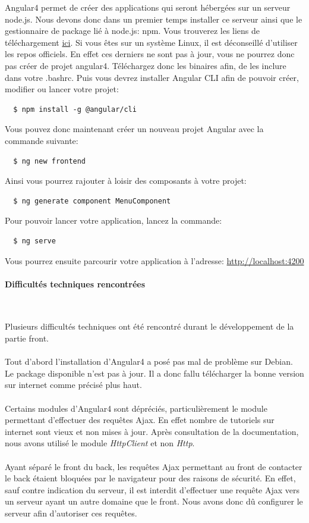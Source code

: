 \documentclass{article}
\begin{document}
  Angular4 permet de créer des applications qui seront hébergées sur un serveur node.js.
  Nous devons donc dans un premier temps installer ce serveur ainsi que le gestionnaire
  de package lié à node.js: npm. Vous trouverez les liens de téléchargement 
  \href{https://nodejs.org/en/download/}{ici}. Si vous êtes sur un système Linux,
  il est déconseillé d'utiliser les repos officiels. En effet ces derniers ne sont pas à jour,
  vous ne pourrez donc pas créer de projet angular4. Téléchargez donc les binaires afin,
  de les inclure dans votre .bashrc. Puis vous devrez installer
  Angular CLI afin de pouvoir créer, modifier ou lancer votre projet:
  \begin{lstlisting}
  $ npm install -g @angular/cli
  \end{lstlisting}
  Vous pouvez donc maintenant créer un nouveau projet Angular avec la commande suivante:
  \begin{lstlisting}
  $ ng new frontend
  \end{lstlisting}
  Ainsi vous pourrez rajouter à loisir des composants à votre projet:
  \begin{lstlisting}
  $ ng generate component MenuComponent
  \end{lstlisting}
  Pour pouvoir lancer votre application, lancez la commande:
  \begin{lstlisting}
  $ ng serve
  \end{lstlisting}
  Vous pourrez ensuite parcourir votre application à l'adresse: \href{http://localhost:4200}{http://localhost:4200}
  
  \paragraph{Difficultés techniques rencontrées} \
  
  Plusieurs difficultés techniques ont été rencontré durant le développement de la partie front.\\ \\
  Tout d'abord l'installation d'Angular4 a posé pas mal de problème sur Debian. Le
  package disponible n'est pas à jour. Il a donc fallu télécharger la bonne version
  sur internet comme précisé plus haut. \\ \\
  Certains modules d'Angular4 sont dépréciés, particulièrement le module permettant
  d'effectuer des requêtes Ajax. En effet nombre de tutoriels sur internet sont vieux 
  et non mises à jour. Après consultation de la documentation, nous avons utilisé le
  module \emph{HttpClient} et non \emph{Http}. \\ \\
  Ayant séparé le front du back, les requêtes Ajax permettant au front de contacter le
  back étaient bloquées par le navigateur pour des raisons de sécurité. En effet, sauf contre indication
  du serveur, il est interdit d'effectuer une requête Ajax vers un serveur ayant 
  un autre domaine que le front. Nous avons donc dû configurer le serveur 
  afin d'autoriser ces requêtes.
\end{document}
